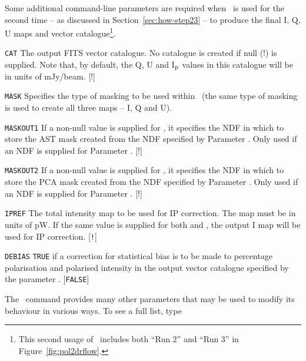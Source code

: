 Some additional command-line parameters are required when \poltwomap\ is
used for the second time -- as discussed in Section~\ref{sec:how-step23}
-- to produce the final I, Q, U maps and vector catalogue\footnote{This
second usage of \poltwomap\ includes both ``Run 2'' and ``Run 3'' in
Figure~\ref{fig:pol2drflow}.}.

\begin{aligndesc}

\item[\texttt{CAT}] The output FITS vector catalogue. No catalogue is
  created if null (!) is supplied. Note that, by default, the Q, U and
  I$_{\textnormal{p}}$ values in this catalogue will be in units of mJy/beam. [!]

\item[\texttt{MASK}] Specifies the type of masking to be used within
  \makemap\ (the same type of masking is used to create all three maps --
  I, Q and U).

\item[\texttt{MASKOUT1}] If a non-null value is supplied for ,
  it specifies the NDF in which to store the AST mask created from the NDF
  specified by Parameter . Only used if an NDF is supplied for
  Parameter . [!]

\item[\texttt{MASKOUT2}] If a non-null value is supplied for ,
  it specifies the NDF in which to store the PCA mask created from the NDF
  specified by Parameter . Only used if an NDF is supplied for
  Parameter . [!]

\item[\texttt{IPREF}] The total intensity map to be used for IP
  correction. The map must be in units of pW. If the same value is
  supplied for both  and , the output I
  map will be used for IP correction. [\texttt{!}]

\item[\texttt{DEBIAS}] \texttt{TRUE} if a correction for statistical bias is to
  be made to percentage polarisation and polarised intensity in the
  output vector catalogue specified by the parameter . [\texttt{FALSE}]
\end{aligndesc}

The \poltwomap\ command provides many other parameters that may be used to
modify its behaviour in various ways. To see a full list, type

\begin{terminalv}
\end{terminalv}


